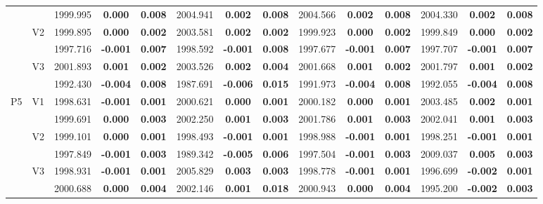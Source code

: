 \documentclass[11pt,a4paper]{article}
\begin{document}
{\begin{sidewaystable}[H]
{\begin{tabular}{cc|ccc|ccc|ccc|ccc|}
   &  & 1999.995 & \textbf{0.000} & \textbf{0.008} & 2004.941 & \textbf{0.002} & \textbf{0.008} & 2004.566 & \textbf{0.002} & \textbf{0.008} & 2004.330 & \textbf{0.002} & \textbf{0.008} \\ 
   & \multirow{2}{*}{V2} & 1999.895 & \textbf{0.000} & \textbf{0.002} & 2003.581 & \textbf{0.002} & \textbf{0.002} & 1999.923 & \textbf{0.000} & \textbf{0.002} & 1999.849 & \textbf{0.000} & \textbf{0.002} \\ 
   &  & 1997.716 & \textbf{-0.001} & \textbf{0.007} & 1998.592 & \textbf{-0.001} & \textbf{0.008} & 1997.677 & \textbf{-0.001} & \textbf{0.007} & 1997.707 & \textbf{-0.001} & \textbf{0.007} \\ 
   & \multirow{2}{*}{V3} & 2001.893 & \textbf{0.001} & \textbf{0.002} & 2003.526 & \textbf{0.002} & \textbf{0.004} & 2001.668 & \textbf{0.001} & \textbf{0.002} & 2001.797 & \textbf{0.001} & \textbf{0.002} \\ 
   &  & 1992.430 & \textbf{-0.004} & \textbf{0.008} & 1987.691 & \textbf{-0.006} & \textbf{0.015} & 1991.973 & \textbf{-0.004} & \textbf{0.008} & 1992.055 & \textbf{-0.004} & \textbf{0.008} \\ 
   \hline \hline\multirow{6}{*}{P5} & \multirow{2}{*}{V1} & 1998.631 & \textbf{-0.001} & \textbf{0.001} & 2000.621 & \textbf{0.000} & \textbf{0.001} & 2000.182 & \textbf{0.000} & \textbf{0.001} & 2003.485 & \textbf{0.002} & \textbf{0.001} \\ 
   &  & 1999.691 & \textbf{0.000} & \textbf{0.003} & 2002.250 & \textbf{0.001} & \textbf{0.003} & 2001.786 & \textbf{0.001} & \textbf{0.003} & 2002.041 & \textbf{0.001} & \textbf{0.003} \\ 
   & \multirow{2}{*}{V2} & 1999.101 & \textbf{0.000} & \textbf{0.001} & 1998.493 & \textbf{-0.001} & \textbf{0.001} & 1998.988 & \textbf{-0.001} & \textbf{0.001} & 1998.251 & \textbf{-0.001} & \textbf{0.001} \\ 
   &  & 1997.849 & \textbf{-0.001} & \textbf{0.003} & 1989.342 & \textbf{-0.005} & \textbf{0.006} & 1997.504 & \textbf{-0.001} & \textbf{0.003} & 2009.037 & \textbf{0.005} & \textbf{0.003} \\ 
   & \multirow{2}{*}{V3} & 1998.931 & \textbf{-0.001} & \textbf{0.001} & 2005.829 & \textbf{0.003} & \textbf{0.003} & 1998.778 & \textbf{-0.001} & \textbf{0.001} & 1996.699 & \textbf{-0.002} & \textbf{0.001} \\ 
   &  & 2000.688 & \textbf{0.000} & \textbf{0.004} & 2002.146 & \textbf{0.001} & \textbf{0.018} & 2000.943 & \textbf{0.000} & \textbf{0.004} & 1995.200 & \textbf{-0.002} & \textbf{0.003} \\ 

\end{tabular}}
\end{sidewaystable}}
\end{document}
